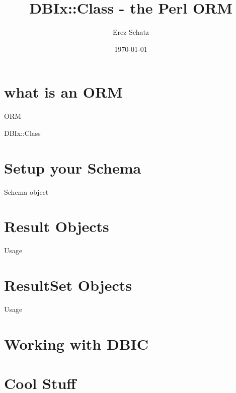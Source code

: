 \documentclass[
mode=present,
style=paintings,
size=14pt,
paper=screen
]{powerdot}
\title{DBIx::Class - the Perl ORM}
\author{Erez Schatz}
\date {\today}
\begin{document}
\maketitle

\section{what is an ORM}
\begin{slide}{ORM}
\end{slide}
\begin{slide}{DBIx::Class}
\end{slide}
\section{Setup your Schema}
\begin{slide}{Schema object}
\end{slide}
\section{Result Objects}
\begin{slide}{Usage}
\end{slide}
\section{ResultSet Objects}
\begin{slide}{Usage}
\end{slide}
\section{Working with DBIC}
\section {Cool Stuff}
\end{document}
